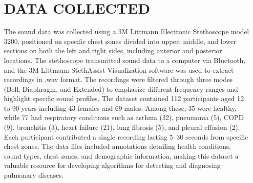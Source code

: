 \documentclass[twocolumn]{article}
\begin{document}
\section{DATA COLLECTED}  
The sound data was collected using a 3M Littmann Electronic Stethoscope model 3200, positioned on specific chest zones divided into upper, middle, and lower sections on both the left and right sides, including anterior and posterior locations. The stethoscope transmitted sound data to a computer via Bluetooth, and the 3M Littmann  StethAssist Visualization software was used to extract recordings in .wav format. The recordings were filtered through three modes (Bell, Diaphragm, and Extended) to emphasize different frequency ranges and highlight specific sound profiles.
The dataset contained 112 participants aged 12 to 90 years including 43 females and 69 males. Among these, 35 were healthy, while 77 had respiratory conditions such as asthma (32), pneumonia (5), COPD (9), bronchitis (3), heart failure (21), lung fibrosis (5), and pleural effusion (2). Each participant contributed a single recording lasting 5–30 seconds from specific chest zones. The data files included annotations detailing health conditions, sound types, chest zones, and demographic information, making this dataset a valuable resource for developing algorithms for detecting and diagnosing pulmonary diseases.


\cite{heart}
\cite{telehealth}




\appendix
\end{document}
